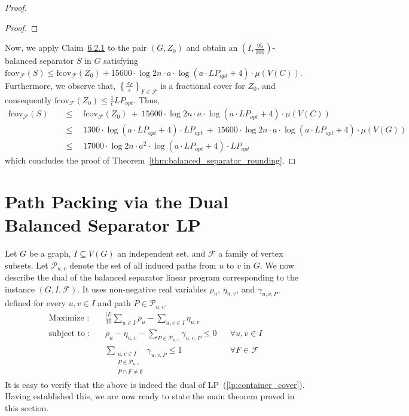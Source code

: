 \documentclass[11pt]{amsart}
\newcommand{\lpopt}{LP_{opt}}
\begin{document}
\begin{proof}
\begin{proof}
    \end{proof}
    Now, we apply Claim~\hyperref[claim:balanced_sep_cutoff_step]{6.2.1} to the pair $(G, Z_0)$ and obtain an $(I, \frac{95}{100})$-balanced separator $S$ in $G$ satisfying $\mathrm{fcov}_{\mathcal{F}}(S) \leq \mathrm{fcov}_{\mathcal{F}}(Z_0) + 15600 \cdot \log 2n \cdot a \cdot  \log(a \cdot \lpopt + 4) \cdot \mu(V(C))$. Furthermore, we observe that, $\left\{\frac{x_F}{\epsilon}\right\}_{F \in \mathcal{F}}$ is a fractional cover for $Z_0$, and consequently $\mathrm{fcov}_{\mathcal{F}}(Z_0) \leq \frac{1}{\epsilon} \lpopt$. Thus, 
    \begin{align*}
        \mathrm{fcov}_{\mathcal{F}}(S) \quad
        &\leq \quad \mathrm{fcov}_{\mathcal{F}}(Z_0)\ +\ 15600 \cdot \log 2n \cdot a \cdot  \log(a \cdot \lpopt + 4) \cdot \mu(V(C)) \\
        &\leq \quad 1300 \cdot  \log(a \cdot \lpopt + 4) \cdot \lpopt\ +\ 15600 \cdot \log 2n \cdot a \cdot  \log(a \cdot \lpopt + 4) \cdot \mu(V(G)) \\
        &\leq \quad 17000 \cdot \log 2n \cdot a^2 \cdot  \log(a \cdot \lpopt + 4) \cdot \lpopt
    \end{align*}
    which concludes the proof of Theorem~\ref{thm:balanced_separator_rounding}.
\end{proof}
    
\section{Path Packing via the Dual Balanced Separator LP}\label{sec:dual_of_balanced_separator}
Let $G$ be a graph, $I \subseteq V(G)$ an independent set, and $\mathcal{F}$ a family of vertex subsets. Let $\mathcal{P}_{u,v}$ denote the set of all induced paths from $u$ to $v$ in $G$. We now describe the dual of the balanced separator linear program corresponding to the instance $(G, I, \mathcal{F})$. It uses non-negative real variables $\rho_u$, $\eta_{u,v}$, and $\gamma_{u,v,P}$, defined for every $u,v \in I$ and path $P \in \mathcal{P}_{u,v}$.
% 
\begin{align}\label{lp:balanced_path_packing}
    \text{Maximize :}&\quad \frac{|I|}{10}\sum\limits_{u\in I} \rho_u - \sum\limits_{u,v \in I}\eta_{u,v}\\
    \nonumber \text{subject to :}&\quad \rho_u - \eta_{u,v} - \sum\limits_{P\in\mathcal{P}_{u,v}}\gamma_{u,v,P} \leq 0 && \forall u,v \in I\\
    \nonumber &\quad \sum\limits_{\substack{u,v \in I\\ P\in \mathcal{P}_{u,v}\\ P\cap F\neq \emptyset}} \gamma_{u,v,P} \leq 1 && \forall F\in \mathcal{F}
\end{align}
% 
It is easy to verify that the above is indeed the dual of LP~(\ref{lp:container_cover}). Having established this, we are now ready to state the main theorem proved in this section.
\end{document}
